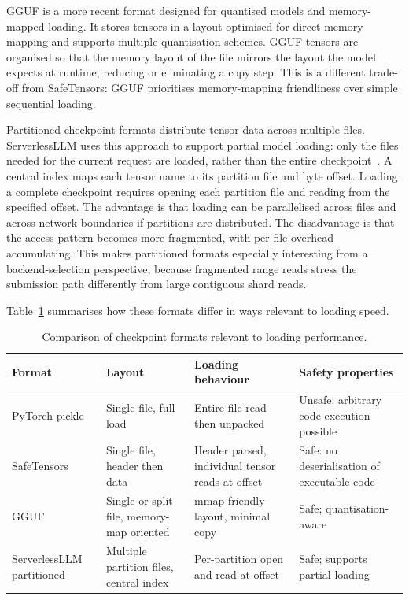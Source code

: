 GGUF is a more recent format designed for quantised models and memory-mapped loading. It stores tensors in a layout optimised for direct memory mapping and supports multiple quantisation schemes. GGUF tensors are organised so that the memory layout of the file mirrors the layout the model expects at runtime, reducing or eliminating a copy step. This is a different trade-off from SafeTensors: GGUF prioritises memory-mapping friendliness over simple sequential loading.

Partitioned checkpoint formats distribute tensor data across multiple files. ServerlessLLM uses this approach to support partial model loading: only the files needed for the current request are loaded, rather than the entire checkpoint~\cite{FU:2024,serverlessllm_repo}. A central index maps each tensor name to its partition file and byte offset. Loading a complete checkpoint requires opening each partition file and reading from the specified offset. The advantage is that loading can be parallelised across files and across network boundaries if partitions are distributed. The disadvantage is that the access pattern becomes more fragmented, with per-file overhead accumulating. This makes partitioned formats especially interesting from a backend-selection perspective, because fragmented range reads stress the submission path differently from large contiguous shard reads.

Table~\ref{tab:format_comparison} summarises how these formats differ in ways relevant to loading speed.

\begin{table}[h]
\caption{Comparison of checkpoint formats relevant to loading performance.}
\label{tab:format_comparison}
\centering
\begin{tabular}{p{3.5cm}p{3cm}p{3cm}p{3.5cm}}
\toprule
Format & Layout & Loading behaviour & Safety properties \\
\midrule
PyTorch pickle & Single file, full load & Entire file read then unpacked & Unsafe: arbitrary code execution possible \\
SafeTensors & Single file, header then data & Header parsed, individual tensor reads at offset & Safe: no deserialisation of executable code \\
GGUF & Single or split file, memory-map oriented & mmap-friendly layout, minimal copy & Safe; quantisation-aware \\
ServerlessLLM partitioned & Multiple partition files, central index & Per-partition open and read at offset & Safe; supports partial loading \\
\bottomrule
\end{tabular}
\end{table}

